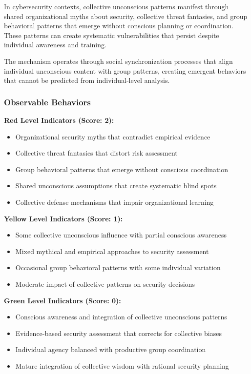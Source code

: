 \documentclass[11pt,a4paper]{article}
\begin{document}
In cybersecurity contexts, collective unconscious patterns manifest through shared organizational myths about security, collective threat fantasies, and group behavioral patterns that emerge without conscious planning or coordination. These patterns can create systematic vulnerabilities that persist despite individual awareness and training.

The mechanism operates through social synchronization processes that align individual unconscious content with group patterns, creating emergent behaviors that cannot be predicted from individual-level analysis\cite{freeman2010}.

\subsubsection{Observable Behaviors}

\textbf{Red Level Indicators (Score: 2):}
\begin{itemize}
\item Organizational security myths that contradict empirical evidence
\item Collective threat fantasies that distort risk assessment
\item Group behavioral patterns that emerge without conscious coordination
\item Shared unconscious assumptions that create systematic blind spots
\item Collective defense mechanisms that impair organizational learning
\end{itemize}

\textbf{Yellow Level Indicators (Score: 1):}
\begin{itemize}
\item Some collective unconscious influence with partial conscious awareness
\item Mixed mythical and empirical approaches to security assessment
\item Occasional group behavioral patterns with some individual variation
\item Moderate impact of collective patterns on security decisions
\end{itemize}

\textbf{Green Level Indicators (Score: 0):}
\begin{itemize}
\item Conscious awareness and integration of collective unconscious patterns
\item Evidence-based security assessment that corrects for collective biases
\item Individual agency balanced with productive group coordination
\item Mature integration of collective wisdom with rational security planning
\end{itemize}
\end{document}
